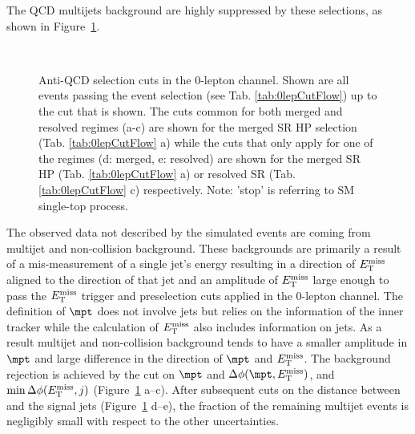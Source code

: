 The QCD multijets background are highly suppressed by these selections, as shown in Figure~\ref{fig:0lepAntiQCD}. 
\begin{figure}[ht]
	\centering
    	\\
        \caption{Anti-QCD selection cuts in the 0-lepton channel. Shown are all events passing the event selection (see Tab. \ref{tab:0lepCutFlow}) up to the cut that is shown. The cuts common for both merged and resolved regimes (a-c) are shown for the merged SR HP selection (Tab. \ref{tab:0lepCutFlow} a) while the cuts that only apply for one of the regimes (d: merged, e: resolved) are shown for the merged SR HP (Tab. \ref{tab:0lepCutFlow} a) or resolved SR (Tab. \ref{tab:0lepCutFlow} c) respectively. 
Note: 'stop' is referring to SM single-top process.
} 
    \label{fig:0lepAntiQCD}
\end{figure}

The observed data not described by the simulated events are coming from multijet and non-collision background.
These backgrounds are primarily a result of a mis-measurement of a single jet's energy resulting in a direction of $E_{\mathrm{T}}^{\mathrm{miss}}$ aligned to the direction of that jet and an amplitude of $E_{\mathrm{T}}^{\mathrm{miss}}$ large enough to pass the $E_{\mathrm{T}}^{\mathrm{miss}}$ trigger and preselection cuts applied in the 0-lepton channel.
The definition of $\mpt$ does not involve jets but relies on the information of the inner tracker while the calculation of $E_{\mathrm{T}}^{\mathrm{miss}}$ also includes information on jets.
As a result multijet and non-collision background tends to have a smaller amplitude in $\mpt$ and large difference in the direction of $\mpt$ and $E_{\mathrm{T}}^{\mathrm{miss}}$.
The background rejection is achieved by the cut on $\mpt$ and $\Delta \phi(\mpt,\met)$, and $\min \Delta \phi(E_{\mathrm{T}}^{\mathrm{miss}}, j)$ (Figure~\ref{fig:0lepAntiQCD} a--c).
After subsequent cuts on the distance between \met and the signal jets (Figure~\ref{fig:0lepAntiQCD} d--e), the fraction of the remaining multijet events is negligibly small with respect to the other uncertainties.


